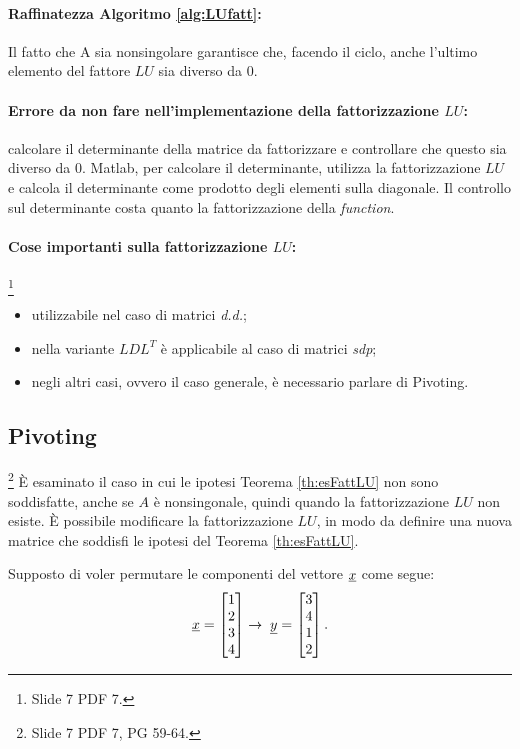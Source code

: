\paragraph{Raffinatezza Algoritmo \ref{alg:LUfatt}:} Il fatto che A sia nonsingolare garantisce che, facendo il ciclo, anche l'ultimo elemento del fattore $LU$ sia diverso da 0.

\paragraph{Errore da non fare nell'implementazione della fattorizzazione $LU$:} calcolare il determinante della matrice da fattorizzare e controllare che questo sia diverso da 0. Matlab, per calcolare il determinante, utilizza la fattorizzazione $LU$ e calcola il determinante come prodotto degli elementi sulla diagonale. Il controllo sul determinante costa quanto la fattorizzazione della \textit{function}.

\paragraph{Cose importanti sulla fattorizzazione $LU$:}\footnote{Slide 7 PDF 7.}
\begin{itemize}
    \item utilizzabile nel caso di matrici \textit{d.d.};
    \item nella variante $LDL^T$ è applicabile al caso di matrici \textit{sdp};
    \item negli altri casi, ovvero il caso generale, è necessario parlare di Pivoting.
\end{itemize}

\subsection{Pivoting}\label{sscetion:Pivoting}
\footnote{Slide 7 PDF 7, PG 59-64.}
È esaminato il caso in cui le ipotesi Teorema \ref{th:esFattLU} non sono soddisfatte, anche se $A$ è nonsingonale, quindi quando la fattorizzazione $LU$ non esiste. È possibile modificare la fattorizzazione $LU$, in modo da definire una nuova matrice che soddisfi le ipotesi del Teorema \ref{th:esFattLU}.

Supposto di voler permutare le componenti del vettore $\uline x$ come segue:
\begin{equation*}
        \uline x=
        \begin{bmatrix}
            1\\
            2\\
            3\\
            4
        \end{bmatrix}\rightarrow\; \uline y=
        \begin{bmatrix}
            3\\
            4\\
            1\\
            2
        \end{bmatrix}.
\end{equation*}

